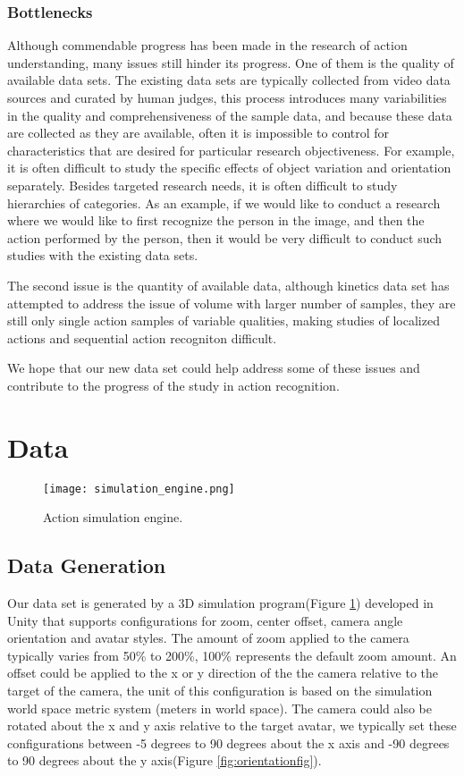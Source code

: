 \documentclass[
	a4paper, %
	10pt, %
	unnumberedsections, %
	twoside, %
]{t0004}
\begin{document}
\subsubsection{Bottlenecks} Although commendable progress has been made in the research of action understanding, many issues still hinder its progress. One of them is the quality of available data sets. The existing data sets are typically collected from video data sources and curated by human judges, this process introduces many variabilities in the quality and comprehensiveness of the sample data, and because these data are collected as they are available, often it is impossible to control for characteristics that are desired for particular research objectiveness. For example, it is often difficult to study the specific effects of object variation and orientation separately. Besides targeted research needs, it is often difficult to study hierarchies of categories. As an example, if we would like to conduct a research where we would like to first recognize the person in the image, and then the action performed by the person, then it would be very difficult to conduct such studies with the existing data sets.

The second issue is the quantity of available data, although kinetics data set has attempted to address the issue of volume with larger number of samples, they are still only single action samples of variable qualities, making studies of localized actions and sequential action recogniton difficult.

We hope that our new data set could help address some of these issues and contribute to the progress of the study in action recognition.

\section{Data}

\begin{figure}
	\texttt{[image: simulation\_engine.png]}
	\caption{Action simulation engine.}
	\label{fig:simulationengine}
\end{figure}

\subsection{Data Generation} Our data set is generated by a 3D simulation program(Figure \ref{fig:simulationengine}) developed in Unity that supports configurations for zoom, center offset, camera angle orientation and avatar styles. The amount of zoom applied to the camera typically varies from 50\% to 200\%, 100\% represents the default zoom amount. An offset could be applied to the x or y direction of the the camera relative to the target of the camera, the unit of this configuration is based on the simulation world space metric system (meters in world space).  The camera could also be rotated about the x and y axis relative to the target avatar, we typically set these configurations between -5 degrees to 90 degrees about the x axis and -90 degrees to 90 degrees about the y axis(Figure \ref{fig:orientationfig}).
\end{document}
